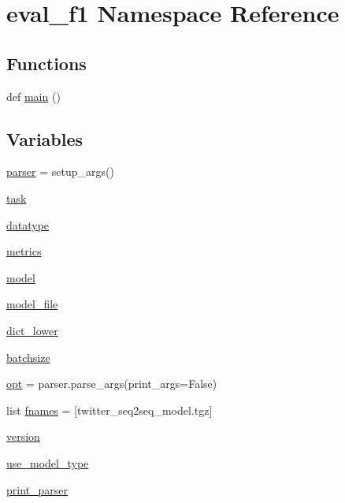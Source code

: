 \hypertarget{namespaceeval__f1}{}\section{eval\+\_\+f1 Namespace Reference}
\label{namespaceeval__f1}
\subsection*{Functions}
\begin{DoxyCompactItemize}
\item 
def \hyperlink{namespaceeval__f1_a4e679ae3282c9831e50ff8ed0a325a0e}{main} ()
\end{DoxyCompactItemize}
\subsection*{Variables}
\begin{DoxyCompactItemize}
\item 
\hyperlink{namespaceeval__f1_ab2fe9dff5b10a93f59eb1f52eccee74c}{parser} = setup\+\_\+args()
\item 
\hyperlink{namespaceeval__f1_a6e79a8f9a4c48b767c1787f30ab85050}{task}
\item 
\hyperlink{namespaceeval__f1_a4b54b4e79cfc57c5d57afb5395959159}{datatype}
\item 
\hyperlink{namespaceeval__f1_adeaf328bb2995785d55bd5db609c696c}{metrics}
\item 
\hyperlink{namespaceeval__f1_a642d651c51ad9549b2fa7c09cbb15c6a}{model}
\item 
\hyperlink{namespaceeval__f1_a293cb9102016cf4d791145b46c7c0986}{model\+\_\+file}
\item 
\hyperlink{namespaceeval__f1_a567ff0916073051faca8f1bb6bcc20ca}{dict\+\_\+lower}
\item 
\hyperlink{namespaceeval__f1_aad0fe588709e8822a0cb7f0047a228f9}{batchsize}
\item 
\hyperlink{namespaceeval__f1_a35e7e28dce87506eff4c9190e26627cb}{opt} = parser.\+parse\+\_\+args(print\+\_\+args=False)
\item 
list \hyperlink{namespaceeval__f1_a27a5e82cbc3839ff9ea58baf5fb9c589}{fnames} = \mbox{[}\textquotesingle{}twitter\+\_\+seq2seq\+\_\+model.\+tgz\textquotesingle{}\mbox{]}
\item 
\hyperlink{namespaceeval__f1_adec39e598f14f69ec4db14205bdb170c}{version}
\item 
\hyperlink{namespaceeval__f1_aa7088a68c600d6d34816d9ec03d41d6b}{use\+\_\+model\+\_\+type}
\item 
\hyperlink{namespaceeval__f1_ad7fc136d56e78943e93a7b24a2da36e6}{print\+\_\+parser}
\end{DoxyCompactItemize}


